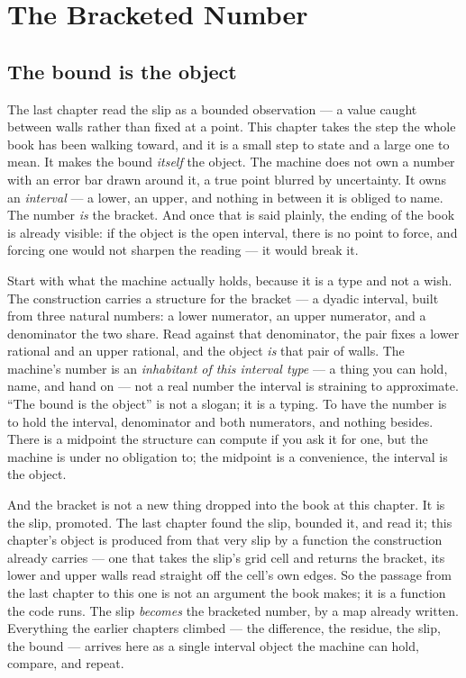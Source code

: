 \chapter{The Bracketed Number}

\section{The bound is the object}

The last chapter read the slip as a bounded observation --- a value caught between walls rather than fixed at a point.
This chapter takes the step the whole book has been walking toward, and it is a small step to state and a large one to
mean. It makes the bound \emph{itself} the object. The machine does not own a number with an error bar drawn around it,
a true point blurred by uncertainty. It owns an \emph{interval} --- a lower, an upper, and nothing in between it is
obliged to name. The number \emph{is} the bracket. And once that is said plainly, the ending of the book is already
visible: if the object is the open interval, there is no point to force, and forcing one would not sharpen the reading
--- it would break it.

Start with what the machine actually holds, because it is a type and not a wish. The construction carries a structure
for the bracket --- a dyadic interval, built from three natural numbers: a lower numerator, an upper numerator, and a
denominator the two share. Read against that denominator, the pair fixes a lower rational and an upper rational, and
the object \emph{is} that pair of walls. The machine's number is an \emph{inhabitant of this interval type} --- a thing
you can hold, name, and hand on --- not a real number the interval is straining to approximate. ``The bound is the
object'' is not a slogan; it is a typing. To have the number is to hold the interval, denominator and both numerators,
and nothing besides. There is a midpoint the structure can compute if you ask it for one, but the machine is under no
obligation to; the midpoint is a convenience, the interval is the object.

And the bracket is not a new thing dropped into the book at this chapter. It is the slip, promoted. The last chapter
found the slip, bounded it, and read it; this chapter's object is produced from that very slip by a function the
construction already carries --- one that takes the slip's grid cell and returns the bracket, its lower and upper walls
read straight off the cell's own edges. So the passage from the last chapter to this one is not an argument the book
makes; it is a function the code runs. The slip \emph{becomes} the bracketed number, by a map already written.
Everything the earlier chapters climbed --- the difference, the residue, the slip, the bound --- arrives here as a
single interval object the machine can hold, compare, and repeat.

